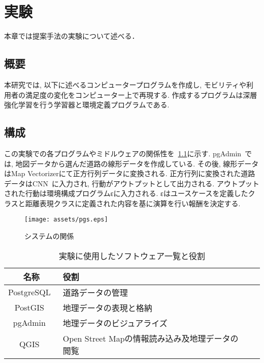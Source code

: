 \chapter{実験}
\label{implementation}

本章では提案手法の実験について述べる．

\section{概要}

本研究では, 以下に述べるコンピュータープログラムを作成し, モビリティや利用者の満足度の変化をコンピューター上で再現する.
作成するプログラムは深層強化学習を行う学習器と環境定義プログラムである.

\section{構成}

この実験での各プログラムやミドルウェアの関係性を~\ref{system_overview}に示す.
pgAdmin~\cite{pgadmin}では, 地図データから選んだ道路の線形データを作成している. その後, 線形データはMap Vectorizerにて正方行列データに変換される.
正方行列に変換された道路データはCNN~\cite{CNN}に入力され, 行動がアウトプットとして出力される. アウトプットされた行動は環境構成プログラムεに入力される.
εはユースケースを定義したクラスと距離表現クラスに定義された内容を基に演算を行い報酬を決定する.

\begin{figure}[H]
  \centering  %
  \texttt{[image: assets/pgs.eps]}
  \caption{システムの関係}  \label{system_overview}
\end{figure}




\begin{table}[h]
  \caption{実験に使用したソフトウェア一覧と役割}
  \label{table:SpeedOfLight}
  \centering
  \begin{tabular}{clll}
    \hline
      名称 & 役割 \\
      \hline \hline
      PostgreSQL~\cite{pgsql} & 道路データの管理 \\
      PostGIS~\cite{postgis} & 地理データの表現と格納 \\
      pgAdmin~\cite{pgadmin} & 地理データのビジュアライズ \\
      QGIS~\cite{qgis} & Open Street Mapの情報読み込み及地理データの閲覧 \\
    \hline
  \end{tabular}
\end{table}


